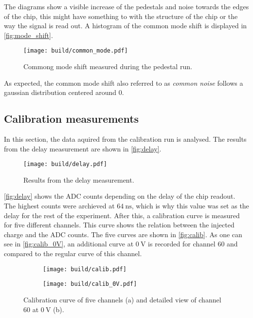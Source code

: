 The diagrams show a visible increase of the pedestals and noise towards the edges of the chip,
this might have something to with the structure of the chip or the way the signal is read out.
A histogram of the common mode shift is displayed in \autoref{fig:mode_shift}.

\begin{figure}[H]
  \centering
  \texttt{[image: build/common\_mode.pdf]}
  \caption{Commong mode shift measured during the pedestal run.}
  \label{fig:mode_shift}
\end{figure}

As expected, the common mode shift also referred to as \textit{common noise} follows a gaussian
distribution centered around $0$.

\subsection{Calibration measurements}

In this section, the data aquired from the calibration run is analysed. The results from the delay measurement
are shown in \autoref{fig:delay}.

\begin{figure}[H]
  \centering
  \texttt{[image: build/delay.pdf]}
  \caption{Results from the delay measurement.}
  \label{fig:delay}
\end{figure}

\autoref{fig:delay} shows the ADC counts depending on the delay of the chip readout. The highest
counts were archieved at $\qty{64}{\nano\second}$, which is why this value was set as the
delay for the rest of the experiment.
After this, a calibration curve is measured for five different channels. This curve shows
the relation between the injected charge and the ADC counts. The five curves are shown
in \autoref{fig:calib}.
As one can see in \autoref{fig:calib_0V}, an additional curve at $\qty{0}{\volt}$ is recorded for channel $60$
and compared to the regular curve of this channel.

\begin{figure}[H]
  \centering
    \begin{subfigure}{0.45\textwidth}
      \texttt{[image: build/calib.pdf]}
      \caption{}
      \label{fig:calib}
    \end{subfigure}
    \begin{subfigure}{0.45\textwidth}
      \texttt{[image: build/calib\_0V.pdf]}
      \caption{}
      \label{fig:calib_0V}
    \end{subfigure} 
  \caption{Calibration curve of five channels (a) and detailed view of channel $60$ at $\qty{0}{\volt}$ (b).}
  \label{fig:calib_run}
\end{figure}

